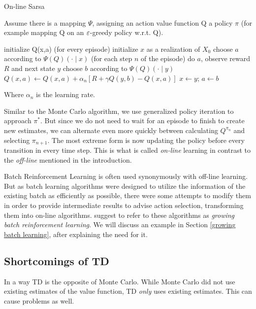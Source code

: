 \begin{algorithm}
	\caption{On-line Sarsa \parencite{suttonReinforcementLearningIntroduction1998}}
	Assume there is a mapping \(\Psi\), assigning an action value function Q a policy \(\pi\) (for example mapping Q on an \(\varepsilon\)-greedy policy w.r.t. Q).
	\begin{algorithmic}[1]
		\State initialize Q(x,a)
		 (for every episode)
			\State initialize \(x\) as a realization of \(X_0\)
			\State choose \(a\) according to \(\Psi(Q)(\cdot \mid x)\)
			\Repeat(for each step \(n\) of the episode)
				\State do \(a\), observe reward \(R\) and next state \(y\)
				\State choose \(b\) according to \(\Psi(Q)(\cdot \mid y)\)
				\State \(Q(x,a)\gets Q(x,a) + \alpha_n [R+\gamma Q(y,b) -Q(x,a) ]\)
				\State \(x\gets y\); \(a\gets b \)
		\EndWhile
	\end{algorithmic}
	Where \(\alpha_n\) is the learning rate.
\end{algorithm}

Similar to the Monte Carlo algorithm, we use generalized policy iteration to approach \(\pi^*\). But since we do not need to wait for an episode to finish to create new estimates, we can alternate even more quickly between calculating \(Q^{\pi_n}\) and selecting \(\pi_{n+1}\). The most extreme form is now updating the policy before every transition in every time step. This is what is called \emph{on-line} learning in contrast to the \emph{off-line} mentioned in the introduction. 

Batch Reinforcement Learning is often used synonymously with off-line learning. But as batch learning algorithms were designed to utilize the information of the existing batch as efficiently as possible, there were some attempts to modify them in order to provide intermediate results to advise action selection, transforming them into on-line algorithms. \textcite{langeBatchReinforcementLearning2012} suggest to refer to these algorithms as \emph{growing batch reinforcement learning}. We will discuss an example in Section \ref{growing batch learning}, after explaining the need for it. 

\subsection{Shortcomings of TD} \label{shortcomings TD}
In a way TD is the opposite of Monte Carlo. While Monte Carlo did not use existing estimates of the value function, TD \emph{only} uses existing estimates. This can cause problems as well.


